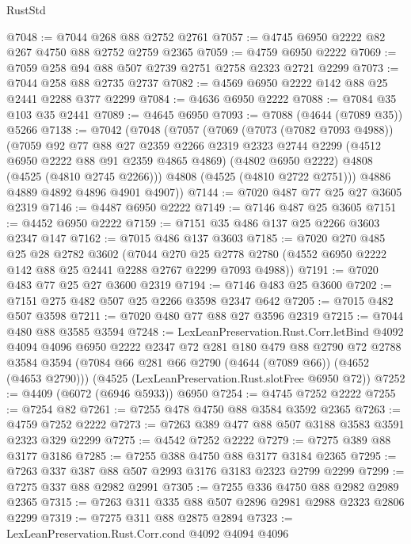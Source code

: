\begin{lexlean}{RustStd}
\begin{coremodule}
@7048 := @7044 @268 @88 @2752 @2761
@7057 := @4745 @6950 @2222 @82 @267 @4750 @88 @2752 @2759 @2365
@7059 := @4759 @6950 @2222
@7069 := @7059 @258 @94 @88 @507 @2739 @2751 @2758 @2323 @2721 @2299
@7073 := @7044 @258 @88 @2735 @2737
@7082 := @4569 @6950 @2222 @142 @88 @25 @2441 @2288 @377 @2299
@7084 := @4636 @6950 @2222
@7088 := @7084 @35 @103 @35 @2441
@7089 := @4645 @6950
@7093 := @7088 (@4644 (@7089 @35)) @5266
@7138 := @7042
    (@7048
      (@7057
        (@7069
          (@7073 (@7082 @7093 @4988))
          (@7059
            @92
            @77
            @88
            @27
            @2359
            @2266
            @2319
            @2323
            @2744
            @2299
            (@4512 @6950 @2222 @88 @91 @2359 @4865 @4869)
            (@4802 @6950 @2222)
            @4808
            (@4525 (@4810 @2745 @2266)))
          @4808
          (@4525 (@4810 @2722 @2751)))
        @4886
        @4889
        @4892
        @4896
        @4901
        @4907))
@7144 := @7020 @487 @77 @25 @27 @3605 @2319
@7146 := @4487 @6950 @2222
@7149 := @7146 @487 @25 @3605
@7151 := @4452 @6950 @2222
@7159 := @7151 @35 @486 @137 @25 @2266 @3603 @2347 @147
@7162 := @7015 @486 @137 @3603
@7185 := @7020
    @270
    @485
    @25
    @28
    @2782
    @3602
    (@7044
      @270
      @25
      @2778
      @2780
      (@4552 @6950 @2222 @142 @88 @25 @2441 @2288 @2767 @2299 @7093 @4988))
@7191 := @7020 @483 @77 @25 @27 @3600 @2319
@7194 := @7146 @483 @25 @3600
@7202 := @7151 @275 @482 @507 @25 @2266 @3598 @2347 @642
@7205 := @7015 @482 @507 @3598
@7211 := @7020 @480 @77 @88 @27 @3596 @2319
@7215 := @7044 @480 @88 @3585 @3594
@7248 := LexLeanPreservation.Rust.Corr.letBind
    @4092
    @4094
    @4096
    @6950
    @2222
    @2347
    @72
    @281
    @180
    @479
    @88
    @2790
    @72
    @2788
    @3584
    @3594
    (@7084 @66 @281 @66 @2790 (@4644 (@7089 @66)) (@4652 (@4653 @2790)))
    (@4525 (LexLeanPreservation.Rust.slotFree @6950 @72))
@7252 := @4409 (@6072 (@6946 @5933)) @6950
@7254 := @4745 @7252 @2222
@7255 := @7254 @82
@7261 := @7255 @478 @4750 @88 @3584 @3592 @2365
@7263 := @4759 @7252 @2222
@7273 := @7263 @389 @477 @88 @507 @3188 @3583 @3591 @2323 @329 @2299
@7275 := @4542 @7252 @2222
@7279 := @7275 @389 @88 @3177 @3186
@7285 := @7255 @388 @4750 @88 @3177 @3184 @2365
@7295 := @7263 @337 @387 @88 @507 @2993 @3176 @3183 @2323 @2799 @2299
@7299 := @7275 @337 @88 @2982 @2991
@7305 := @7255 @336 @4750 @88 @2982 @2989 @2365
@7315 := @7263 @311 @335 @88 @507 @2896 @2981 @2988 @2323 @2806 @2299
@7319 := @7275 @311 @88 @2875 @2894
@7323 := LexLeanPreservation.Rust.Corr.cond @4092 @4094 @4096

\end{coremodule}
\end{lexlean}
